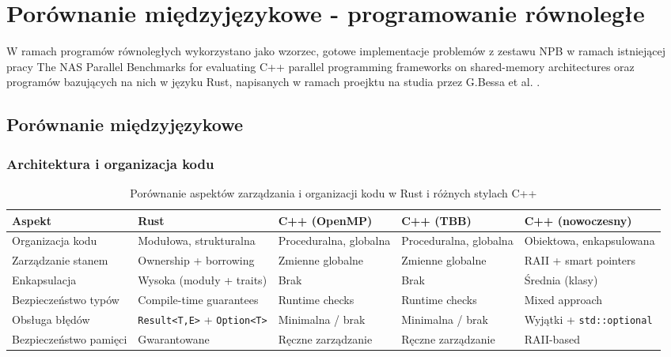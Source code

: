 \chapter{Porównanie międzyjęzykowe - programowanie równoległe}
W ramach programów równoległych wykorzystano jako wzorzec, gotowe implementacje problemów z zestawu NPB w ramach istniejącej pracy The NAS Parallel Benchmarks for evaluating C++ parallel programming frameworks on shared-memory architectures \cite{CPPNPB} oraz programów bazujących na nich w języku Rust, napisanych w ramach proejktu na studia przez G.Bessa et al. \cite{NPBRust}.






\section{Porównanie międzyjęzykowe}
\subsection{Architektura i organizacja kodu}
\begin{table}[H]
    \centering
    \caption{Porównanie aspektów zarządzania i organizacji kodu w Rust i różnych stylach C++}
    \begin{tabularx}{\textwidth}{lXXXX}
    \toprule
    \textbf{Aspekt} &
    \textbf{Rust} &
    \textbf{C++ (OpenMP)} &
    \textbf{C++ (TBB)} &
    \textbf{C++ (nowoczesny)} \\
    \midrule
    Organizacja kodu &
    Modułowa, strukturalna &
    Proceduralna, globalna &
    Proceduralna, globalna &
    Obiektowa, enkapsulowana \\
    \hline
    Zarządzanie stanem &
    Ownership + borrowing &
    Zmienne globalne &
    Zmienne globalne &
    RAII + smart pointers \\
    \hline
    Enkapsulacja &
    Wysoka (moduły + traits) &
    Brak &
    Brak &
    Średnia (klasy) \\
    \hline
    Bezpieczeństwo typów &
    Compile-time guarantees &
    Runtime checks &
    Runtime checks &
    Mixed approach \\
    \hline
    Obsługa błędów &
    \texttt{Result<T,E>} + \texttt{Option<T>} &
    Minimalna / brak &
    Minimalna / brak &
    Wyjątki + \texttt{std::optional} \\
    \hline
    Bezpieczeństwo pamięci &
    Gwarantowane &
    Ręczne zarządzanie &
    Ręczne zarządzanie &
    RAII-based \\
    \bottomrule
    \end{tabularx}
\end{table}

